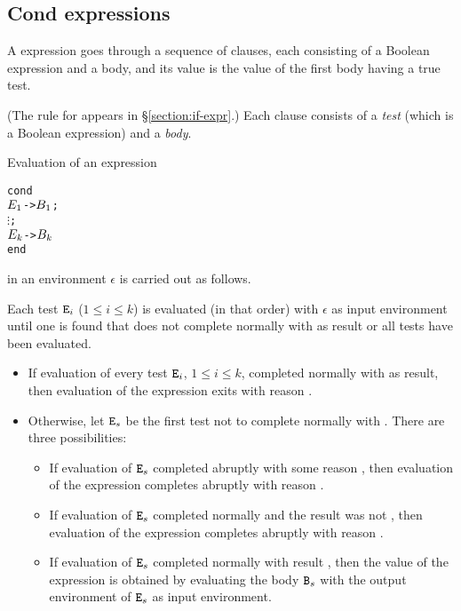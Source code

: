 \ifStd
\subsection{Cond expressions}

\label{section:cond-expr}

A  expression goes through a sequence of clauses, each
consisting of a Boolean expression and a body, and its value is the
value of the first body having a true test.

\SYNTAX

\begin{rules}
\ifStd
{}
       {  }

       { \OR
         \TXT{;} }

       { }
\fi
\end{rules}
(The rule for  appears in \S\ref{section:if-expr}.)
Each clause consists of a \emph{test} (which is a Boolean expression)
and a \emph{body}.

\EVALUATION

Evaluation of an expression
\begin{alltt}
cond
    \(\Z{E}\sb{1}\) -> \(\Z{B}\sb{1}\) ;
    \(\vdots\) ;
    \(\Z{E}\sb{k}\) -> \(\Z{B}\sb{k}\)
end
\end{alltt}
in an environment $\epsilon$ is carried out as follows.

Each test ${\tt{\sl E}}_i$ ($1\leq i\leq k$) is evaluated (in that
order) with
$\epsilon$ as input environment until one is found that
does not complete normally with  as result or
all tests have been evaluated.

\begin{itemize}
\item If evaluation of every test ${\tt{\sl E}}_i$, $1\leq i\leq k$,
completed normally with  as result, then evaluation
of the  expression exits with reason .
\item Otherwise, let ${\tt{\sl E}}_s$ be the first test not to complete
normally with .  There are three possibilities:
\begin{itemize}
\item If evaluation of ${\tt{\sl E}}_s$ completed abruptly with some
reason , then evaluation of the  expression
completes abruptly with reason .
\item If evaluation of ${\tt{\sl E}}_s$ completed normally and the
result was not , then evaluation of the  expression
completes abruptly with reason .
\item If evaluation of ${\tt{\sl E}}_s$ completed normally with
result , then the value of the  expression
is obtained by evaluating the body ${\tt{\sl B}}_s$ with the
output environment of ${\tt{\sl E}}_s$ as input environment.
\end{itemize}
\end{itemize}

